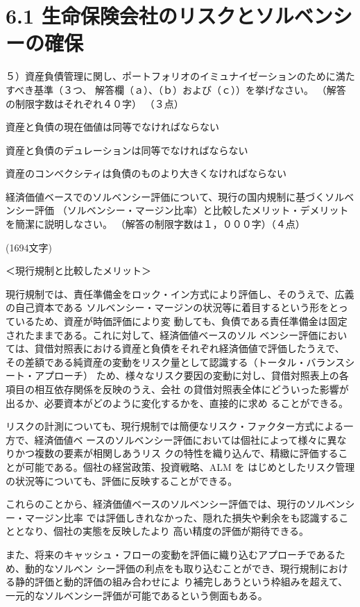\documentclass[report,gutter=10mm,fore-edge=10mm,uplatex,dvipdfmx]{jlreq}
\begin{document}
\section{
6.1 生命保険会社のリスクとソルベンシーの確保
}
５）資産負債管理に関し、ポートフォリオのイミュナイゼーションのために満たすべき基準（３つ、
解答欄（ａ）、（ｂ）および（ｃ））を挙げなさい。
（解答の制限字数はそれぞれ４０字）
（３点）

\answer{}
資産と負債の現在価値は同等でなければならない

資産と負債のデュレーションは同等でなければならない

資産のコンベクシティは負債のものより大きくなければならない

経済価値ベースでのソルベンシー評価について、現行の国内規制に基づくソルベンシー評価
（ソルベンシー・マージン比率）と比較したメリット・デメリットを簡潔に説明しなさい。
（解答の制限字数は１，０００字）（４点）

\answer{}
(1694文字)

＜現行規制と比較したメリット＞

 現行規制では、責任準備金をロック・イン方式により評価し、そのうえで、広義の自己資本である
ソルベンシー・マージンの状況等に着目するという形をとっているため、資産が時価評価により変
動しても、負債である責任準備金は固定されたままである。これに対して、経済価値ベースのソル
ベンシー評価においては、貸借対照表における資産と負債をそれぞれ経済価値で評価したうえで、
その差額である純資産の変動をリスク量として認識する（トータル・バランスシート・アプローチ）
ため、様々なリスク要因の変動に対し、貸借対照表上の各項目の相互依存関係を反映のうえ、会社
の貸借対照表全体にどういった影響が出るか、必要資本がどのように変化するかを、直接的に求め
ることができる。

 リスクの計測についても、現行規制では簡便なリスク・ファクター方式による一方で、経済価値ベ
ースのソルベンシー評価においては個社によって様々に異なりかつ複数の要素が相関しあうリス
クの特性を織り込んで、精緻に評価することが可能である。個社の経営政策、投資戦略、ALM を
はじめとしたリスク管理の状況等についても、評価に反映することができる。

 これらのことから、経済価値ベースのソルベンシー評価では、現行のソルベンシー・マージン比率
では評価しきれなかった、隠れた損失や剰余をも認識することとなり、個社の実態を反映したより
高い精度の評価が期待できる。

また、将来のキャッシュ・フローの変動を評価に織り込むアプローチであるため、動的なソルベン
シー評価の利点をも取り込むことができ、現行規制における静的評価と動的評価の組み合わせによ
り補完しあうという枠組みを超えて、一元的なソルベンシー評価が可能であるという側面もある。
\end{document}
